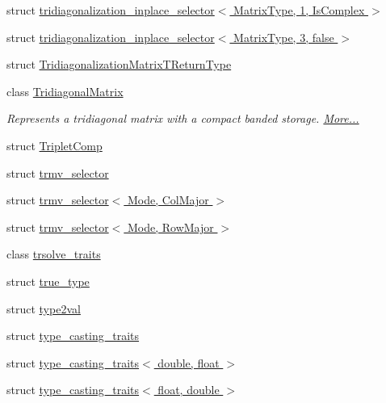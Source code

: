 \begin{DoxyCompactItemize}
\item 
struct \hyperlink{struct_eigen_1_1internal_1_1tridiagonalization__inplace__selector_3_01_matrix_type_00_011_00_01_is_complex_01_4}{tridiagonalization\+\_\+inplace\+\_\+selector$<$ Matrix\+Type, 1, Is\+Complex $>$}
\item 
struct \hyperlink{struct_eigen_1_1internal_1_1tridiagonalization__inplace__selector_3_01_matrix_type_00_013_00_01false_01_4}{tridiagonalization\+\_\+inplace\+\_\+selector$<$ Matrix\+Type, 3, false $>$}
\item 
struct \hyperlink{struct_eigen_1_1internal_1_1_tridiagonalization_matrix_t_return_type}{Tridiagonalization\+Matrix\+T\+Return\+Type}
\item 
class \hyperlink{group___core___module_class_eigen_1_1internal_1_1_tridiagonal_matrix}{Tridiagonal\+Matrix}
\begin{DoxyCompactList}\small\item\em Represents a tridiagonal matrix with a compact banded storage.  \hyperlink{group___core___module_class_eigen_1_1internal_1_1_tridiagonal_matrix}{More...}\end{DoxyCompactList}\item 
struct \hyperlink{struct_eigen_1_1internal_1_1_triplet_comp}{Triplet\+Comp}
\item 
struct \hyperlink{struct_eigen_1_1internal_1_1trmv__selector}{trmv\+\_\+selector}
\item 
struct \hyperlink{struct_eigen_1_1internal_1_1trmv__selector_3_01_mode_00_01_col_major_01_4}{trmv\+\_\+selector$<$ Mode, Col\+Major $>$}
\item 
struct \hyperlink{struct_eigen_1_1internal_1_1trmv__selector_3_01_mode_00_01_row_major_01_4}{trmv\+\_\+selector$<$ Mode, Row\+Major $>$}
\item 
class \hyperlink{class_eigen_1_1internal_1_1trsolve__traits}{trsolve\+\_\+traits}
\item 
struct \hyperlink{struct_eigen_1_1internal_1_1true__type}{true\+\_\+type}
\item 
struct \hyperlink{struct_eigen_1_1internal_1_1type2val}{type2val}
\item 
struct \hyperlink{struct_eigen_1_1internal_1_1type__casting__traits}{type\+\_\+casting\+\_\+traits}
\item 
struct \hyperlink{struct_eigen_1_1internal_1_1type__casting__traits_3_01double_00_01float_01_4}{type\+\_\+casting\+\_\+traits$<$ double, float $>$}
\item 
struct \hyperlink{struct_eigen_1_1internal_1_1type__casting__traits_3_01float_00_01double_01_4}{type\+\_\+casting\+\_\+traits$<$ float, double $>$}

\end{DoxyCompactItemize}
